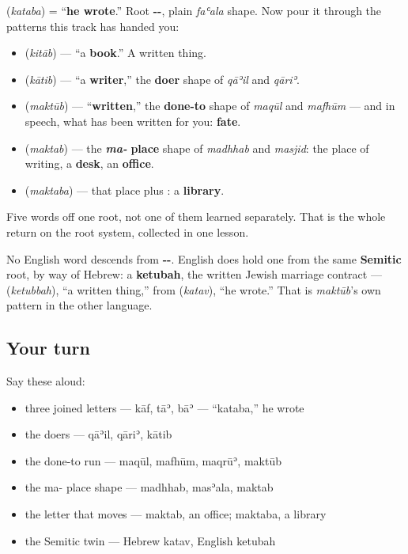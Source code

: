 \begin{cousinweb}
\textbf{} (\emph{kataba}) = \textquotedblleft{}\textbf{he wrote}.\textquotedblright{} Root \textbf{--}, plain \emph{faʿala} shape. Now pour it through the patterns this track has handed you:

\begin{itemize}
\raggedright
  \item \textbf{} (\emph{kitāb}) — \textquotedblleft{}a \textbf{book}.\textquotedblright{} A written thing.
  \item \textbf{} (\emph{kātib}) — \textquotedblleft{}a \textbf{writer},\textquotedblright{} the \textbf{doer} shape of \emph{qāʾil} and \emph{qāriʾ}.
  \item \textbf{} (\emph{maktūb}) — \textquotedblleft{}\textbf{written},\textquotedblright{} the \textbf{done-to} shape of \emph{maqūl} and \emph{mafhūm} — and in speech, what has been written for you: \textbf{fate}.
  \item \textbf{} (\emph{maktab}) — the \emph{\textbf{ma-}} \textbf{place} shape of \emph{madhhab} and \emph{masjid}: the place of writing, a \textbf{desk}, an \textbf{office}.
  \item \textbf{} (\emph{maktaba}) — that place plus \textbf{}: a \textbf{library}.
\end{itemize}

Five words off one root, not one of them learned separately. That is the whole return on the root system, collected in one lesson.

No English word descends from \textbf{--}. English does hold one from the same \textbf{Semitic} root, by way of Hebrew: a \textbf{ketubah}, the written Jewish marriage contract — \textbf{} (\emph{ketubbah}), \textquotedblleft{}a written thing,\textquotedblright{} from \textbf{} (\emph{katav}), \textquotedblleft{}he wrote.\textquotedblright{} That is \emph{maktūb}'s own pattern in the other language.
\end{cousinweb}

\subsection*{Your turn}
Say these aloud:

\begin{itemize}
\raggedright
  \item three joined letters — kāf, tāʾ, bāʾ — \textquotedblleft{}kataba,\textquotedblright{} he wrote
  \item the doers — qāʾil, qāriʾ, kātib
  \item the done-to run — maqūl, mafhūm, maqrūʾ, maktūb
  \item the ma- place shape — madhhab, masʾala, maktab
  \item the letter that moves — maktab, an office; maktaba, a library
  \item the Semitic twin — Hebrew katav, English ketubah
\end{itemize}

